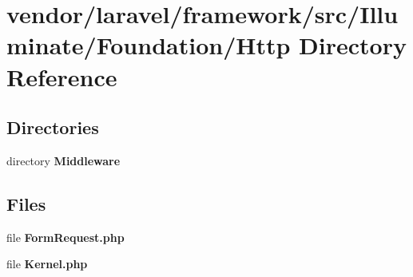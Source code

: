 \section{vendor/laravel/framework/src/\+Illuminate/\+Foundation/\+Http Directory Reference}
\label{dir_885acb27d69a8668bc53be3db40d303b}
\subsection*{Directories}
\begin{DoxyCompactItemize}
\item 
directory {\bf Middleware}
\end{DoxyCompactItemize}
\subsection*{Files}
\begin{DoxyCompactItemize}
\item 
file {\bf Form\+Request.\+php}
\item 
file {\bf Kernel.\+php}
\end{DoxyCompactItemize}
